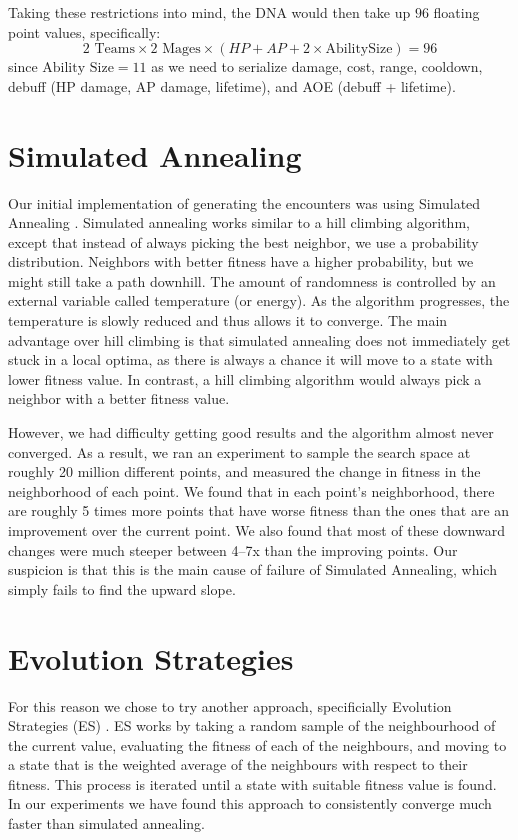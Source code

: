 Taking these restrictions into mind, the DNA would then take up $96$ floating point values,
specifically: $$2 \text{ Teams} \times 2 \text{ Mages} \times ( HP + AP + 2 \times \text{AbilitySize}) = 96$$ since $\text{Ability Size} = 11$ as we need to serialize damage, cost, range, cooldown,
debuff (HP damage, AP damage, lifetime), and AOE (debuff + lifetime).

\section{Simulated Annealing}

Our initial implementation of generating the encounters was using Simulated Annealing \citep{ai-modern}. Simulated annealing works similar to a hill climbing algorithm, except that instead of always picking the best neighbor, we use a probability distribution. Neighbors with better fitness have a higher probability, but we might still take a path downhill. The amount of randomness is controlled by an external variable called temperature (or energy). As the algorithm progresses, the temperature is slowly reduced and thus allows it to converge. The main advantage over hill climbing is that simulated annealing does not immediately get stuck in a local optima, as there is always a chance it will move to a state with lower fitness value. In contrast, a hill climbing algorithm \citep{ai-modern} would always pick a neighbor with a better fitness value.

However, we had difficulty getting good results and the algorithm almost never converged. As a result, we ran an experiment to sample the search space at roughly 20 million different points, and measured the change in fitness in the neighborhood of each point. We found that in each point's neighborhood, there are roughly 5 times more points that have worse fitness than the ones that are an improvement over the current point. We also found that most of these downward changes were much steeper between 4--7x than the improving points. Our suspicion is that this is the main cause of failure of Simulated Annealing, which simply fails to find the upward slope.

\section{Evolution Strategies}

For this reason we chose to try another approach, specificially Evolution
Strategies (ES) \citep{evolution-strategies}. ES works by taking a random sample of the
neighbourhood of the current value, evaluating the fitness of each of the neighbours, and
moving to a state that is the weighted average of the neighbours with respect to their fitness.
This process is iterated until a state with suitable fitness value is found. In our experiments
we have found this approach to consistently converge much faster than simulated annealing.

